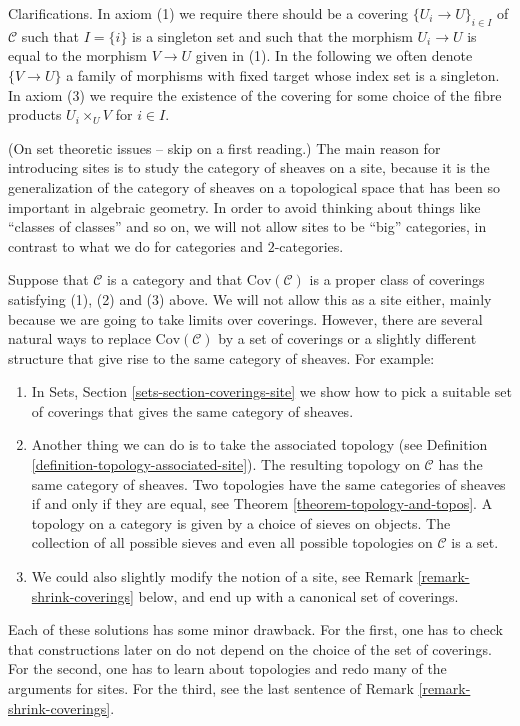 \noindent
Clarifications. In axiom (1) we require there should be a covering
$\{U_i \to U\}_{i \in I}$ of $\mathcal{C}$ such that $I = \{i\}$
is a singleton set and such that the morphism $U_i \to U$ is equal to
the morphism $V \to U$ given in (1). In the following we often denote
$\{V \to U\}$ a family of morphisms with fixed target whose index set
is a singleton. In axiom (3) we require the existence of the covering
for some choice of the fibre products $U_i \times_U V$ for $i \in I$.

\begin{remark}
\label{remark-no-big-sites}
(On set theoretic issues -- skip on a first reading.)
The main reason for introducing sites is to study the
category of sheaves on a site, because it is the generalization
of the category of sheaves on a topological space that has
been so important in algebraic geometry. In order to avoid thinking
about things like ``classes of classes'' and so on, we will
not allow sites to be ``big'' categories, in contrast to what
we do for categories and $2$-categories.

\medskip\noindent
Suppose that $\mathcal{C}$ is a category and that
$\text{Cov}(\mathcal{C})$ is a proper class of coverings
satisfying (1), (2) and (3) above. We will not allow this as a
site either, mainly because we are going to take limits over coverings.
However, there are several natural
ways to replace $\text{Cov}(\mathcal{C})$ by a set of coverings
or a slightly different structure
that give rise to the same category of sheaves. For example:
\begin{enumerate}
\item In Sets, Section \ref{sets-section-coverings-site}
we show how to pick a suitable set of
coverings that gives the same category of sheaves.
\item Another thing we can do is to take the associated topology
(see Definition \ref{definition-topology-associated-site}).
The resulting topology on $\mathcal{C}$ has the same category of sheaves.
Two topologies have the same categories of sheaves if and only if
they are equal, see Theorem \ref{theorem-topology-and-topos}.
A topology on a category is given by a choice of sieves on objects.
The collection of all possible sieves and even all possible
topologies on $\mathcal{C}$ is a set.
\item We could also slightly modify the notion of a site, see
Remark \ref{remark-shrink-coverings} below, and end up with a
canonical set of coverings.
\end{enumerate}
Each of these solutions has some minor drawback. For the first, one has
to check that constructions later on do not depend on the choice
of the set of coverings. For the second, one has to learn about topologies
and redo many of the arguments for sites. For the third, see
the last sentence of Remark \ref{remark-shrink-coverings}.


\end{remark}
